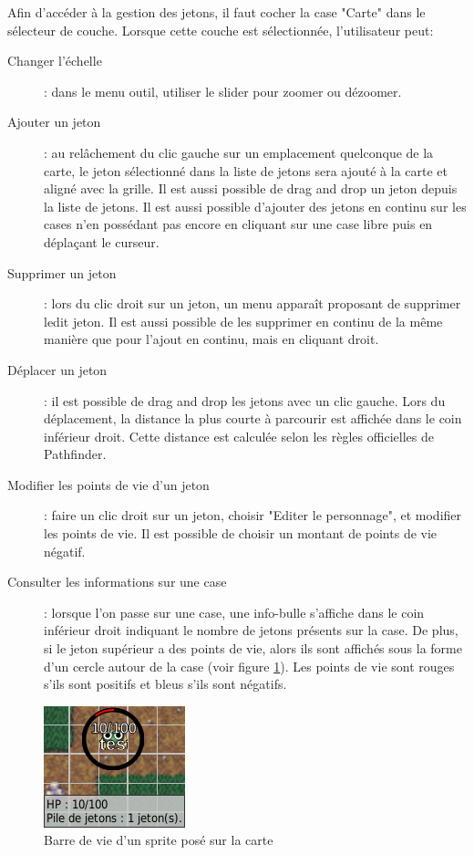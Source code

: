 Afin d'accéder à la gestion des jetons, il faut cocher la case "Carte" dans le sélecteur de couche. Lorsque cette couche est sélectionnée, l'utilisateur peut: 
\begin{description}
	\item[Changer l'échelle]: dans le menu outil, utiliser le slider pour zoomer ou dézoomer.
	\item[Ajouter un jeton]: au relâchement du clic gauche sur un emplacement quelconque de la carte, le jeton sélectionné dans la liste de jetons sera ajouté à la carte et aligné avec la grille. Il est aussi possible de drag and drop un jeton depuis la liste de jetons. Il est aussi possible d'ajouter des jetons en continu sur les cases n'en possédant pas encore en cliquant sur une case libre puis en déplaçant le curseur.
	\item[Supprimer un jeton]: lors du clic droit sur un jeton, un menu apparaît proposant de supprimer ledit jeton. Il est aussi possible de les supprimer en continu de la même manière que pour l'ajout en continu, mais en cliquant droit.
	\item[Déplacer un jeton]: il est possible de drag and drop les jetons avec un clic gauche. Lors du déplacement, la distance la plus courte à parcourir est affichée dans le coin inférieur droit. Cette distance est calculée selon les règles officielles de Pathfinder.
	\item[Modifier les points de vie d'un jeton]: faire un clic droit sur un jeton, choisir "Editer le personnage", et modifier les points de vie. Il est possible de choisir un montant de points de vie négatif.
	\item[Consulter les informations sur une case]: lorsque l'on passe sur une case, une info-bulle s'affiche dans le coin inférieur droit indiquant le nombre de jetons présents sur la case. De plus, si le jeton supérieur a des points de vie, alors ils sont affichés sous la forme d'un cercle autour de la case (voir figure \ref{fig:lifebar}). Les points de vie sont rouges s'ils sont positifs et bleus s'ils sont négatifs.
\end{description}

\begin{figure}[h!]
	\centering
	\includegraphics[scale=0.9]{img/gameobject_lifebar.png}
	\caption{Barre de vie d'un sprite posé sur la carte}
    \label{fig:lifebar}
\end{figure}


